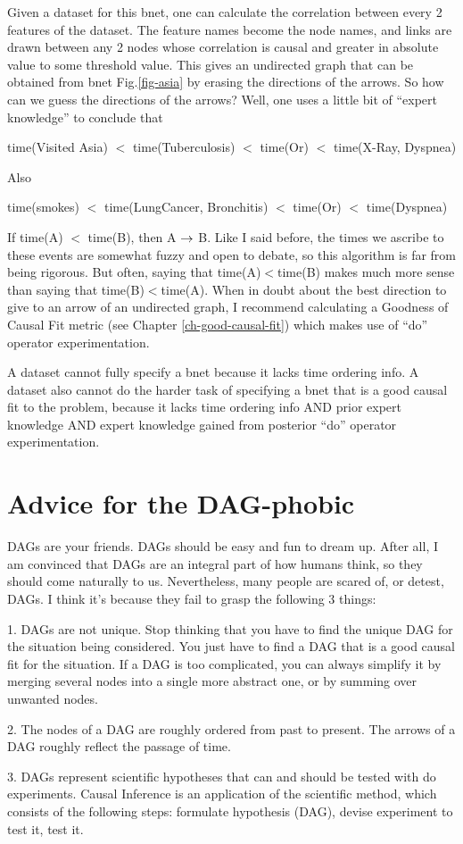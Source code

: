 Given a dataset for this bnet, one can calculate the correlation between
every 2 features of the dataset. The feature names become the node names, and
links are drawn between any 2 nodes whose correlation is 
causal and greater in absolute
value to some threshold value.
This gives an undirected graph that can be
obtained from bnet Fig.\ref{fig-asia}
 by erasing the directions of the arrows. So how
can we guess the directions of the arrows? Well, one uses a little bit of
``expert knowledge” to conclude that

time(Visited Asia) $<$ time(Tuberculosis) $<$ time(Or) $<$ time(X-Ray,
Dyspnea)

Also

time(smokes) $<$ time(LungCancer, Bronchitis) $<$ time(Or) $<$ time(Dyspnea)

If time(A) $<$ time(B), then A $\rightarrow$ B. Like I
said before, the times we ascribe to
these events are somewhat fuzzy and open to debate, so this algorithm is far
from being rigorous. But often, saying that  time(A)$<$time(B) makes much more
sense than saying that time(B)$<$time(A). When in doubt about the best
direction to give to an arrow of an undirected graph, I recommend calculating
a Goodness of Causal Fit metric (see Chapter
\ref{ch-good-causal-fit}) which makes use of ``do” operator
experimentation.


A dataset cannot fully specify a
bnet because it lacks time ordering info. A dataset also cannot do the harder
task of specifying a bnet that is a good causal fit to the problem, because
it lacks time ordering info AND prior expert knowledge AND expert knowledge
gained from posterior ``do” operator experimentation.

\section{Advice for the DAG-phobic}
\label{sec0-advice-dagophobic}

DAGs are your friends. DAGs should be easy and fun to dream up. After all, I
am convinced that DAGs are an integral part of how humans think, so they
should come naturally to us.  Nevertheless, many people are scared of, or
detest, DAGs. I think it’s because they fail to grasp the following 3 things:

1. DAGs are not unique. Stop thinking that you have to find the unique DAG
for the situation being considered. You just have to find a DAG that is a
good causal fit for the situation. If a DAG is too complicated, you can
always simplify it by merging several nodes into a single more abstract one,
or by summing over unwanted nodes.

2. The nodes of a DAG are roughly ordered from past to present. The arrows of a DAG roughly
reflect the passage of time.

3. DAGs represent scientific hypotheses that can and should be tested with
do experiments. Causal Inference is an
application of the scientific method, which consists
of the following steps:
formulate hypothesis (DAG), devise experiment
to test it, test it.

